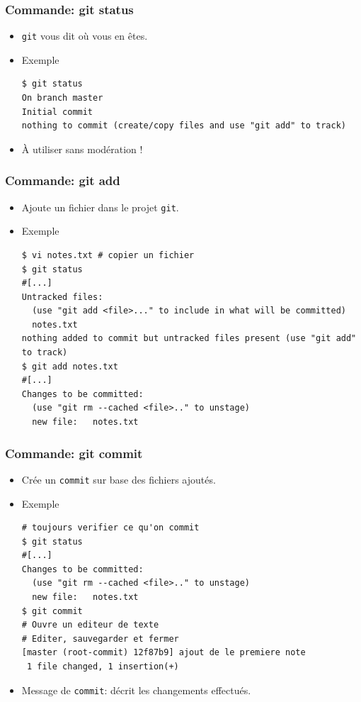 \documentclass{beamer}
\begin{document}
\begin{frame}[fragile]
\frametitle{Commande: git status}
\begin{itemize}
    \item \texttt{git} vous dit o\`u vous en êtes.
    \item Exemple
\begin{lstlisting}
$ git status
On branch master
Initial commit
nothing to commit (create/copy files and use "git add" to track)
\end{lstlisting}
\item À utiliser sans modération !
\end{itemize}
\end{frame}

\begin{frame}[fragile]
\frametitle{Commande: git add}
\begin{itemize}
    \item Ajoute un fichier dans le projet \texttt{git}.
    \item Exemple
\begin{lstlisting}
$ vi notes.txt # copier un fichier
$ git status
#[...]
Untracked files:
  (use "git add <file>..." to include in what will be committed)
  notes.txt
nothing added to commit but untracked files present (use "git add" to track)
$ git add notes.txt
#[...]
Changes to be committed:
  (use "git rm --cached <file>.." to unstage)
  new file:   notes.txt
\end{lstlisting}
\end{itemize}
\end{frame}

\begin{frame}[fragile]
\frametitle{Commande: git commit}
\begin{itemize}
    \item Crée un \texttt{commit} sur base des fichiers ajoutés.
    \item Exemple
\begin{lstlisting}
# toujours verifier ce qu'on commit
$ git status
#[...]
Changes to be committed:
  (use "git rm --cached <file>.." to unstage)
  new file:   notes.txt
$ git commit
# Ouvre un editeur de texte
# Editer, sauvegarder et fermer
[master (root-commit) 12f87b9] ajout de le premiere note
 1 file changed, 1 insertion(+)
\end{lstlisting}
\item Message de \texttt{commit}: décrit les changements effectués.
\end{itemize}
\end{frame}
\end{document}
